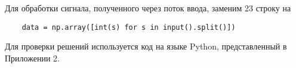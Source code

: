 Для обработки сигнала, полученного через поток ввода, заменим 23 строку на 

\begin{verbatim}
    data = np.array([int(s) for s in input().split()])
\end{verbatim}

Для проверки решений используется код на языке Python, представленный в Приложении 2.

